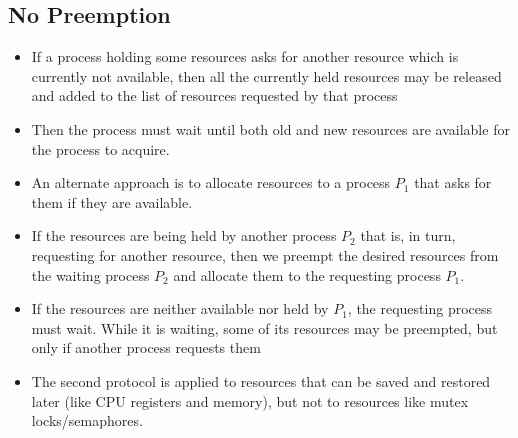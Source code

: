 \documentclass{article}
\theoremstyle{plain}
\theoremstyle{definition}
\begin{document}
\subsection{No Preemption}
\begin{itemize}
    \item If a process holding some resources asks for another resource which is currently not available, then all the currently held resources may be released and added to the list of resources requested by that process
    
    \item Then the process must wait until both old and new resources are available for the process to acquire. 
    
    \item An alternate approach is to allocate resources to a process $P_1$ that asks for them if they are available.
    
    \item If the resources are being held by another process $P_2$ that is, in turn, requesting for another resource, then we preempt the desired resources from the waiting process $P_2$ and allocate them to the requesting process $P_1$. 
    
    \item If the resources are neither available nor held by $P_1$, the requesting process must wait. While it is waiting, some of its resources may be preempted, but only if another process requests them
    
    \item The second protocol is applied to resources that can be saved and restored later (like CPU registers and memory), but not to resources like mutex locks/semaphores.
\end{itemize}
\end{document}
